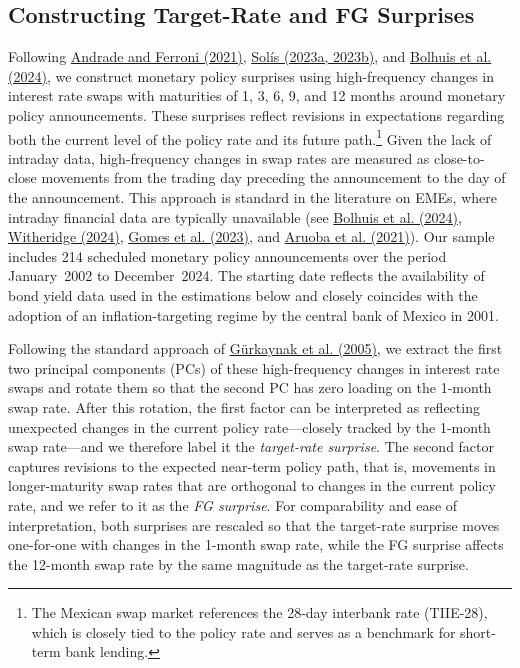 \documentclass[12pt, reqno]{article}
\begin{document}
\subsection{Constructing Target-Rate and FG Surprises}

Following \hyperlink{Andrade and Ferroni (2021)}{Andrade and Ferroni (2021)}, \hyperlink{Solis (2023a)}{Solís (2023a, 2023b)}, and \hyperlink{Bolhuis et al. (2024)}{Bolhuis et al. (2024)}, we construct monetary policy surprises using high-frequency changes in interest rate swaps with maturities of 1, 3, 6, 9, and 12 months around monetary policy announcements. These surprises reflect revisions in expectations regarding both the current level of the policy rate and its future path.\footnote{The Mexican swap market references the 28-day interbank rate (TIIE-28), which is closely tied to the policy rate and serves as a benchmark for short-term bank lending.} Given the lack of intraday data, high-frequency changes in swap rates are measured as close-to-close movements from the trading day preceding the announcement to the day of the announcement. This approach is standard in the literature on EMEs, where intraday financial data are typically unavailable (see \hyperlink{Bolhuis et al. (2024)}{Bolhuis et al. (2024)}, \hyperlink{Witheridge (2024)}{Witheridge (2024)}, \hyperlink{Gomes et al. (2023)}{Gomes et al. (2023)}, and \hyperlink{Aruoba et al. (2021)}{Aruoba et al. (2021)}). Our sample includes 214 scheduled monetary policy announcements over the period January~2002 to December~2024. The starting date reflects the availability of bond yield data used in the estimations below and closely coincides with the adoption of an inflation-targeting regime by the central bank of Mexico in 2001.

Following the standard approach of \hyperlink{Gürkaynak et al. (2005)}{Gürkaynak et al. (2005)}, we extract the first two principal components (PCs) of these high-frequency changes in interest rate swaps and rotate them so that the second PC has zero loading on the 1-month swap rate. After this rotation, the first factor can be interpreted as reflecting unexpected changes in the current policy rate—closely tracked by the 1-month swap rate—and we therefore label it the \emph{target-rate surprise}. The second factor captures revisions to the expected near-term policy path, that is, movements in longer-maturity swap rates that are orthogonal to changes in the current policy rate, and we refer to it as the \emph{FG surprise}. For comparability and ease of interpretation, both surprises are rescaled so that the target-rate surprise moves one-for-one with changes in the 1-month swap rate, while the FG surprise affects the 12-month swap rate by the same magnitude as the target-rate surprise.
\end{document}
